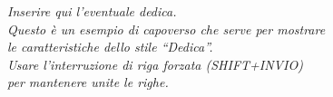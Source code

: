 

\begin{flushright}
    \textit{
        Inserire qui l’eventuale dedica. \\
        Questo è un esempio di capoverso che serve per mostrare \\
        le caratteristiche dello stile “Dedica”.\\
        Usare l’interruzione di riga forzata (SHIFT+INVIO) \\
        per mantenere unite le righe.
    }
\end{flushright}